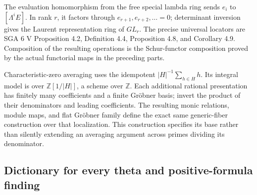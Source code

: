 \documentclass[
  10pt,
]{article}
\begin{document}
The evaluation homomorphism from the free special lambda ring sends
\(e_i\) to \([\Lambda^iE]\). In rank \(r\), it factors through
\(e_{r+1},e_{r+2},\ldots=0\); determinant inversion gives the Laurent
representation ring of \(GL_r\). The precise universal locators are SGA
6 V Proposition 4.2, Definition 4.4, Proposition 4.8, and Corollary 4.9.
Composition of the resulting operations is the Schur-functor composition
proved by the actual functorial maps in the preceding parts.

Characteristic-zero averaging uses the idempotent
\(|H|^{-1}\sum_{h\in H}h\). Its integral model is over
\(\mathbb Z[1/|H|]\), a scheme over \(\mathbb Z\). Each additional
rational presentation has finitely many coefficients and a finite
Gröbner basis; invert the product of their denominators and leading
coefficients. The resulting monic relations, module maps, and flat
Gröbner family define the exact same generic-fiber construction over
that localization. This construction specifies its base rather than
silently extending an averaging argument across primes dividing its
denominator.

\subsection{Dictionary for every theta and positive-formula
finding}\label{dictionary-for-every-theta-and-positive-formula-finding}
\end{document}

